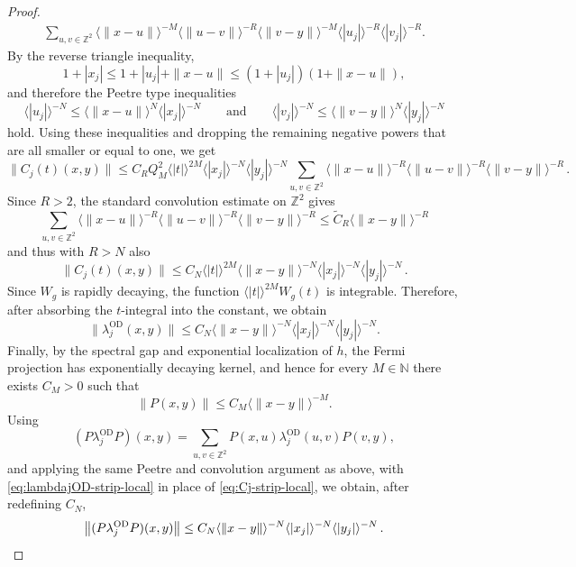 \documentclass[a4paper]{article}
\newcommand{\N}{\mathbb{N}}
\newcommand{\Z}{\mathbb{Z}}
\newcommand{\OD}[1][]{   ^{\mathrm{OD}#1}   }
\theoremstyle{plain}
\theoremstyle{definition}
\theoremstyle{remark}
\renewcommand{\(}{\left(}
\renewcommand{\)}{\right)}
\begin{document}
\begin{proof}
\begin{align*}
    \sum_{u,v\in\Z^2}
    \langle \|x-u\|\rangle^{-M}
    \langle \|u-v\|\rangle^{-R}
    \langle \|v-y\|\rangle^{-M}      
    \langle |u_j|\rangle^{-R}
    \langle |v_j|\rangle^{-R}.
\end{align*}
By the reverse triangle inequality,
\[
    1+|x_j|
    \le
    1+|u_j|+\|x-u\|
    \le
    (1+|u_j|)(1+\|x-u\|),
\]
and therefore the Peetre type inequalities
\[
    \langle |u_j|\rangle^{-N}
    \le
    \langle \|x-u\|\rangle^N
    \langle |x_j|\rangle^{-N} 
\qquad\mbox{and}\qquad
    \langle |v_j|\rangle^{-N}
    \le
    \langle \|v-y\|\rangle^N
    \langle |y_j|\rangle^{-N} 
\]
hold.
Using these inequalities and dropping the remaining negative powers that are all smaller or equal to one, we get
\[
    \|C_j(t)(x,y)\|
     \leq
    C_RQ_M^2\langle |t|\rangle^{2 M}
    \langle |x_j|\rangle^{-N}
    \langle |y_j|\rangle^{-N}\!    
    \sum_{u,v\in\Z^2}\!
    \langle \|x-u\|\rangle^{-R}
    \langle \|u-v\|\rangle^{-R}
    \langle \|v-y\|\rangle^{-R} \,.
\]
Since  $R> 2$, the standard convolution estimate on $\Z^2$
gives
\[
    \sum_{u,v\in\Z^2}
    \langle \|x-u\|\rangle^{-R}
    \langle \|u-v\|\rangle^{-R}
    \langle \|v-y\|\rangle^{-R}
    \le
    \widetilde C_R
    \langle \|x-y\|\rangle^{-R}
\]
and thus with $R>N$ also
\begin{equation}\label{eq:Cjt-strip-local}
    \|C_j(t)(x,y)\|
    \le
    C_N
    \langle |t|\rangle^{2 M}
    \langle \|x-y\|\rangle^{-N}
    \langle |x_j|\rangle^{-N}
    \langle |y_j|\rangle^{-N}\,.
\end{equation}
Since $W_g$ is rapidly decaying, the function
$\langle |t|\rangle^{2 M}W_g(t)$ is integrable. Therefore, after
absorbing the $t$-integral into the constant, we obtain
\begin{equation}\label{eq:lambdajOD-strip-local}
    \|\lambda_j\OD(x,y)\|
    \le
    C_N
    \langle \|x-y\|\rangle^{-N}
    \langle |x_j|\rangle^{-N}
    \langle |y_j|\rangle^{-N}.
\end{equation}
Finally, by the spectral gap and exponential localization of $h$, the Fermi
projection has exponentially decaying kernel, and hence for every
$M\in\N$ there exists $C_M>0$ such that
\[
    \|P(x,y)\|
    \le
    C_M
    \langle \|x-y\|\rangle^{-M}.
\]
Using
\[
    (P\lambda_j\OD P)(x,y)
    =
    \sum_{u,v\in\Z^2}
    P(x,u)\lambda_j\OD(u,v)P(v,y),
\]
and applying the same Peetre and convolution argument as above, with
\eqref{eq:lambdajOD-strip-local} in place of
\eqref{eq:Cj-strip-local}, we obtain, after redefining $C_N$,
\[
    \bigl\|(P\lambda_j\OD P)(x,y)\bigr\|
    \le
    C_N
    \langle \|x-y\|\rangle^{-N}
    \langle |x_j|\rangle^{-N}
    \langle |y_j|\rangle^{-N}\,.\qedhere
\]
\end{proof}
\end{document}
